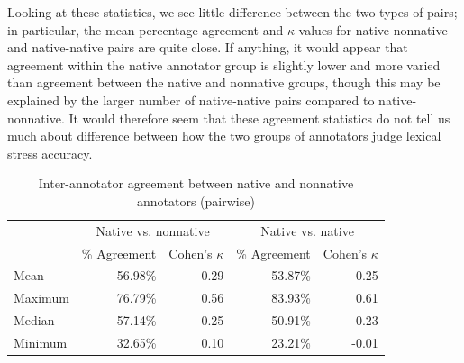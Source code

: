 		Looking at these statistics, we see little difference between the two types of pairs; in particular, the mean percentage agreement and $\kappa$ values for native-nonnative and native-native pairs are quite close. 
		If anything, it would appear that agreement within the native annotator group is slightly lower and more varied than agreement between the native and nonnative groups, though this may be explained by the larger number of native-native pairs compared to native-nonnative. It would therefore seem that these agreement statistics do not tell us much about difference between how the two groups of annotators judge lexical stress accuracy.
		
		
		\begin{table}[p]%
			\centering
			\caption{Inter-annotator agreement between native and nonnative annotators (pairwise)}
			\begin{tabular}{lrrrr}
			\toprule
			& \multicolumn{2}{c}{Native vs. nonnative} & \multicolumn{2}{c}{Native vs. native} \\
			\cmidrule(lr){2-3} \cmidrule(lr){4-5}
			& \% Agreement & Cohen's $\kappa$ & \% Agreement & Cohen's $\kappa$  \\
			\midrule
Mean	&56.98\%	 & 0.29  & 53.87\%	& 0.25\\
Maximum&	76.79\%	& 0.56 & 83.93\%	 & 0.61\\
Median	& 57.14\%	 &0.25 &  50.91\%	& 0.23 \\
Minimum	&32.65\%	 & 0.10 &  23.21\% &	-0.01\\
			\bottomrule
			\end{tabular}
			\label{tab:agreement:L1}
		\end{table} 
		

